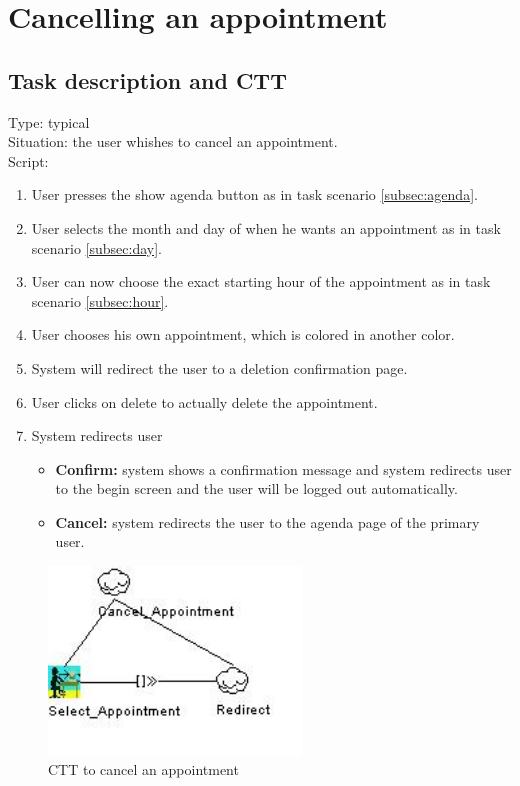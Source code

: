 \documentclass[11pt, a4paper,svglistings]{report}
\begin{document}
\newpage

\section{Cancelling an appointment}

\subsection{Task description and CTT}

Type: typical \\
Situation: the user whishes to cancel an appointment. \\
Script:
\begin{enumerate}
\item User presses the show agenda button as in task scenario \ref{subsec:agenda}.
\item User selects the month and day of when he wants an appointment as in task scenario \ref{subsec:day}.
\item User can now choose the exact starting hour of the appointment as in task scenario \ref{subsec:hour}.
\item User chooses his own appointment, which is colored in another color.
\item System will redirect the user to a deletion confirmation page.
\item User clicks on delete to actually delete the appointment.
\item System redirects user
\begin{itemize}
\item \textbf{Confirm:} system shows a confirmation message and system redirects user to the begin screen and the user will be logged out automatically.
\item \textbf{Cancel:} system redirects the user to the agenda page of the primary user.
\end{itemize}
\end{enumerate}

\begin{figure}[H]
\centering
    \includegraphics[width=0.6\textwidth]{CancelAppointment.jpg}
  \caption[Cancel appointment CTT]{\label{fig:CancelAppointment}CTT to cancel an appointment}
\end{figure}
\end{document}
